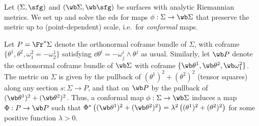 \begin{example}
    Let $(\Sigma,\sfg)$ and $(\wb\Sigma,\wb \sfg)$ be surfaces with analytic Riemannian metrics. We set up and solve the \gls{eds} for maps $\phi:\Sigma\to \wb \Sigma$ that preserve the metric up to (point-dependent) scale, i.e.\ for \emph{conformal} maps.

    Let $P=\Fr^\ast\Sigma$ denote the orthonormal coframe bundle of $\Sigma$, with coframe $\{\theta^1,\theta^2,\omega^2_1=-\omega^1_2\}$ satisfying $\dd\theta^i=-\omega^i_j\wedge \theta^j$ as usual. Similarly, let $\wb P$ denote the orthonormal coframe bundle of $\wb\Sigma$ with coframe $\{\wb\theta^1,\wb\theta^2,\wb\omega^2_1\}$. The metric on $\Sigma$ is given by the pullback of $(\theta^1)^2+(\theta^2)^2$ (tensor squares) along any section $s:\Sigma\to P$, and that on $\wb P$ by the pullback of $(\wb\theta^1)^2+(\wb\theta^2)^2$. Thus, a conformal map $\phi:\Sigma\to \wb\Sigma$ induces  a map $\Phi:P\to \wb P$ such that $\Phi^\ast \left((\wb\theta^1)^2+(\wb\theta^2)^2\right)=\lambda^2 \left((\theta^1)^2+(\theta^2)^2\right)$ for some positive function $\lambda>0$.


\end{example}
